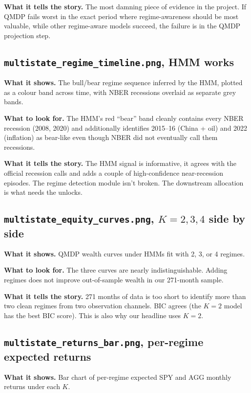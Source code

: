 \documentclass[11pt]{article}
\begin{document}
\textbf{What it tells the story.} The most damning piece of evidence in the project. If QMDP fails worst in the exact period where regime-awareness should be most valuable, while other regime-aware models succeed, the failure is in the QMDP projection step.

\subsection{\texttt{multistate\_regime\_timeline.png}, HMM works}

\textbf{What it shows.} The bull/bear regime sequence inferred by the HMM, plotted as a colour band across time, with NBER recessions overlaid as separate grey bands.

\textbf{What to look for.} The HMM's red ``bear'' band cleanly contains every NBER recession (2008, 2020) and additionally identifies 2015--16 (China + oil) and 2022 (inflation) as bear-like even though NBER did not eventually call them recessions.

\textbf{What it tells the story.} The HMM signal is informative, it agrees with the official recession calls and adds a couple of high-confidence near-recession episodes. The regime detection module isn't broken. The downstream allocation is what needs the unlocks.

\subsection{\texttt{multistate\_equity\_curves.png}, $K = 2, 3, 4$ side by side}

\textbf{What it shows.} QMDP wealth curves under HMMs fit with 2, 3, or 4 regimes.

\textbf{What to look for.} The three curves are nearly indistinguishable. Adding regimes does not improve out-of-sample wealth in our 271-month sample.

\textbf{What it tells the story.} 271 months of data is too short to identify more than two clean regimes from two observation channels. BIC agrees (the $K = 2$ model has the best BIC score). This is also why our headline uses $K = 2$.

\subsection{\texttt{multistate\_returns\_bar.png}, per-regime expected returns}

\textbf{What it shows.} Bar chart of per-regime expected SPY and AGG monthly returns under each $K$.
\end{document}
